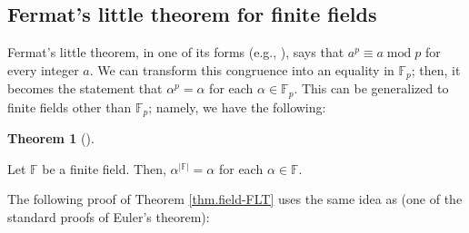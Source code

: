 \documentclass[numbers=enddot,12pt,final,onecolumn,notitlepage]{scrartcl}%
\theoremstyle{definition}
\newtheorem{theo}{Theorem}[subsection]
\newenvironment{theorem}[1][]
{\begin{theo}[#1]\begin{leftbar}}
{\end{leftbar}\end{theo}}
\begin{document}
\subsection{Fermat's little theorem for finite fields}

Fermat's little theorem, in one of its forms (e.g., \cite[Theorem 2.15.2
\textbf{(b)}]{19s}), says that $a^{p}\equiv a\operatorname{mod}p$ for every
integer $a$. We can transform this congruence into an equality in
$\mathbb{F}_{p}$; then, it becomes the statement that $\alpha^{p}=\alpha$ for
each $\alpha\in\mathbb{F}_{p}$. This can be generalized to finite fields other
than $\mathbb{F}_{p}$; namely, we have the following:

\begin{theorem}
\label{thm.field-FLT}Let $\mathbb{F}$ be a finite field. Then, $\alpha
^{\left\vert \mathbb{F}\right\vert }=\alpha$ for each $\alpha\in\mathbb{F}$.
\end{theorem}

The following proof of Theorem \ref{thm.field-FLT} uses the same idea as
\cite[proof of Theorem 2.15.3]{19s} (one of the standard proofs of Euler's theorem):
\end{document}
